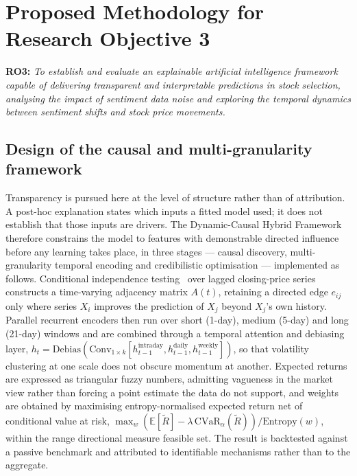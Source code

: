 \section{Proposed Methodology for Research Objective 3}

\textbf{RO3:} \emph{To establish and evaluate an explainable artificial intelligence
framework capable of delivering transparent and interpretable predictions in stock selection,
analysing the impact of sentiment data noise and exploring the temporal dynamics between
sentiment shifts and stock price movements.}

\subsection{Design of the causal and multi-granularity framework}

Transparency is pursued here at the level of structure rather than of attribution. A post-hoc
explanation states which inputs a fitted model used; it does not establish that those inputs
are drivers. The Dynamic-Causal Hybrid Framework therefore constrains the model to features
with demonstrable directed influence before any learning takes place, in three stages ---
causal discovery, multi-granularity temporal encoding and credibilistic optimisation ---
implemented as follows. Conditional independence testing~\cite{spirtes2000,granger1969} over
lagged closing-price series constructs a time-varying adjacency matrix $A(t)$, retaining a
directed edge $e_{ij}$ only where series $X_i$ improves the prediction of $X_j$ beyond $X_j$'s
own history. Parallel recurrent encoders then run over short (1-day), medium (5-day) and long
(21-day) windows and are combined through a temporal attention and debiasing layer,
$h_t = \mathrm{Debias}(\mathrm{Conv}_{1\times k}[h^{\mathrm{intraday}}_{t-1},
h^{\mathrm{daily}}_{t-1}, h^{\mathrm{weekly}}_{t-1}])$, so that volatility clustering at one
scale does not obscure momentum at another. Expected returns are expressed as triangular fuzzy
numbers, admitting vagueness in the market view rather than forcing a point estimate the data do
not support, and weights are obtained by maximising entropy-normalised expected return net of
conditional value at risk,
$\max_w (\mathbb{E}[\tilde{R}] - \lambda\,\mathrm{CVaR}_\alpha(\tilde{R}))/\mathrm{Entropy}(w)$,
within the range directional measure feasible set. The result is backtested against a passive
benchmark and attributed to identifiable mechanisms rather than to the aggregate.

